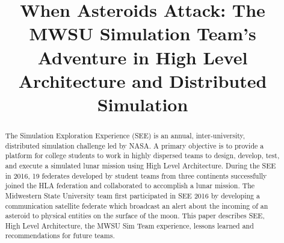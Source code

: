\documentclass[conference]{IEEEtran}
\begin{document}
%
\title{When Asteroids Attack: The MWSU Simulation Team's Adventure in High Level Architecture and Distributed Simulation}


%

\author{
}

\maketitle

\begin{abstract}
The Simulation Exploration Experience (SEE) is an annual, inter-university, distributed simulation challenge led by NASA. A primary objective is to provide a platform for college students to work in highly dispersed teams to design, develop, test, and execute a simulated lunar mission using High Level Architecture. During the SEE in 2016, 19 federates developed by student teams from three continents successfully joined the HLA federation and collaborated to accomplish a lunar mission. The Midwestern State University team first participated in SEE 2016 by developing a communication satellite federate which broadcast an alert about the incoming of an asteroid to physical entities on the surface of the moon. This paper describes SEE, High Level Architecture, the MWSU Sim Team experience, lessons learned and recommendations for future teams.
\end{abstract}
\end{document}
